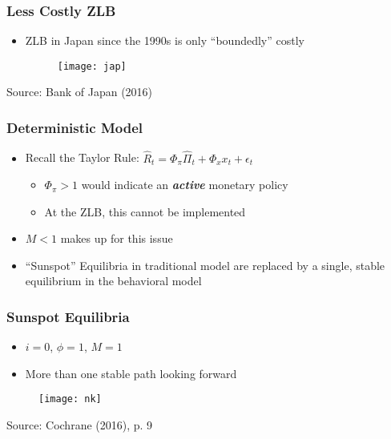 \documentclass{beamer}
\begin{document}

\begin{frame}
	\frametitle{Less Costly ZLB}
	\begin{itemize}
		\item ZLB in Japan since the 1990s is only ``boundedly'' costly
		\begin{figure}[h]
			\texttt{[image: jap]}
		\end{figure}
	\end{itemize}
	{\footnotesize Source: Bank of Japan (2016)}
\end{frame}

 
\begin{frame}
	\frametitle{Deterministic Model}
	\begin{itemize}
		\item Recall the Taylor Rule: $\hat{R}_{t}=\Phi_{\pi}\hat{\Pi}_{t}+\Phi_{x}x_{t}+\epsilon_{t}$
		\vspace{8pt}
		\begin{itemize}
			\item $\Phi_{\pi} > 1$ would indicate an \textit{\textbf{active}} monetary policy
			\item At the ZLB, this cannot be implemented
		\end{itemize}
		\vspace{8pt}
		\item $M < 1$ makes up for this issue
		\item ``Sunspot'' Equilibria in traditional model are replaced by a single, stable equilibrium in the behavioral model
	\end{itemize}
\end{frame}

 
\begin{frame}
	\frametitle{Sunspot Equilibria}
	\begin{itemize}
		\item $i = 0$, $\phi = 1$, $M = 1$
		\item More than one stable path looking forward
	\end{itemize}
	\begin{figure}[h]
		\texttt{[image: nk]}
	\end{figure}
	{\footnotesize Source: Cochrane (2016), p. 9}
\end{frame}
\end{document}
